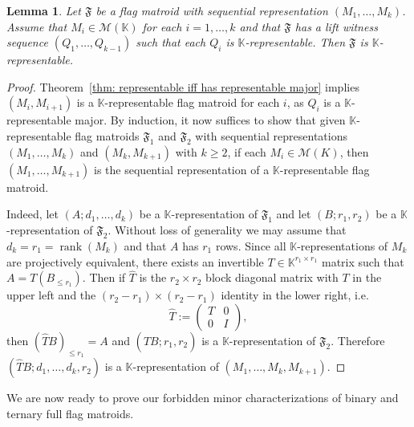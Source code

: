 \documentclass[12pt]{article}
\newtheorem{lemma}[thm]{Lemma}
\theoremstyle{definition}
\DeclareMathOperator{\rank}{rank}
\begin{document}
\begin{lemma}\label{lemma: proj unique K-rep iff lift witness seq is}
    Let $\mathfrak{F}$ be a flag matroid with sequential representation $(M_1,\dots,M_k)$.
    Assume that $M_i \in \mathcal{M}(\mathbb{K})$ for each $i = 1,\dots,k$
    and that $\mathfrak{F}$ has a lift witness sequence $(Q_1,\dots,Q_{k-1})$ such that each $Q_i$ is $\mathbb{K}$-representable.
    Then $\mathfrak{F}$ is $\mathbb{K}$-representable.
\end{lemma}
\begin{proof}
    Theorem~\ref{thm: representable iff has representable major} implies 
    $(M_i,M_{i+1})$ is a $\mathbb{K}$-representable flag matroid for each $i$, as $Q_i$ is a $\mathbb{K}$-representable major.
    By induction, it now suffices to show that given $\mathbb{K}$-representable flag matroids $\mathfrak{F}_1$ and $\mathfrak{F}_2$ with sequential representations $(M_1, \dots, M_{k})$ and $(M_k, M_{k+1})$ with $k \ge 2$, if each $M_i \in \mathcal{M}(K)$,
    then $(M_1, \dots, M_{k+1})$ is the sequential representation of a $\mathbb{K}$-representable flag matroid.

    Indeed, let $(A;d_1,\dots,d_k)$ be a $\mathbb{K}$-representation of $\mathfrak{F}_1$ and let $(B;r_1,r_2)$ be a $\mathbb{K}$-representation of $\mathfrak{F}_2$.
    Without loss of generality we may assume that $d_k = r_1 = \rank(M_k)$ and that $A$ has $r_1$ rows.
    Since all $\mathbb{K}$-representations of $M_k$ are projectively equivalent,
    there exists an invertible $T \in \mathbb{K}^{r_1\times r_1}$ matrix such that $A = T(B_{\le r_1})$.
    Then if $\widehat T$ is the $r_2\times r_2$ block diagonal matrix with $T$ in the upper left
    and the $(r_2-r_1)\times (r_2-r_1)$ identity in the lower right,
    i.e.
    \[
        \widehat T := \begin{pmatrix}
            T & 0 \\
            0 & I
        \end{pmatrix},
    \]
    then $(\widehat T B)_{\le r_1} = A$
    and $(\widehat T B; r_1,r_2)$ is a $\mathbb{K}$-representation of $\mathfrak{F}_2$.
    Therefore $(\widehat T B; d_1,\dots,d_k,r_2)$ is a $\mathbb{K}$-representation of $(M_1,\dots,M_k,M_{k+1})$.
\end{proof}

We are now ready to prove our
forbidden minor characterizations of binary and ternary full flag matroids.
\end{document}
